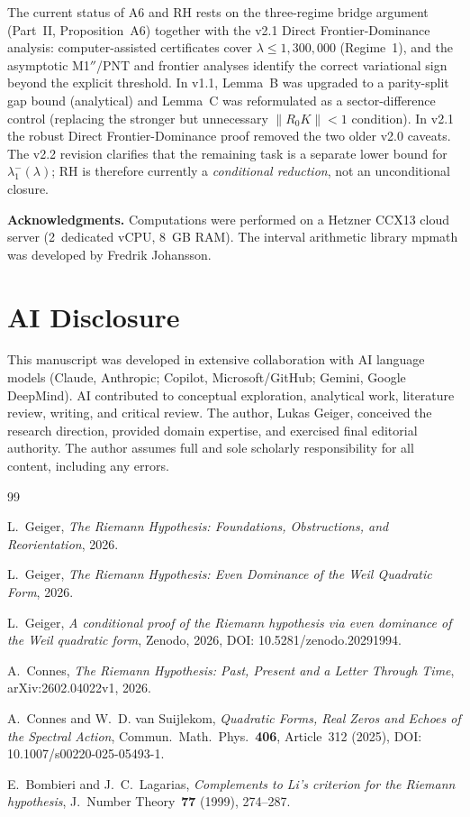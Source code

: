 \documentclass[12pt,a4paper]{article}
\theoremstyle{definition}
\theoremstyle{remark}
\begin{document}
\noindent The current status of A6 and RH rests on the three-regime bridge
argument (Part~II, Proposition~A6) together with the v2.1 Direct
Frontier-Dominance analysis: computer-assisted certificates cover
$\lambda \leq 1{,}300{,}000$ (Regime~1), and the asymptotic M1$''$/PNT and
frontier analyses identify the correct variational sign beyond the explicit
threshold. In v1.1, Lemma~B was upgraded to a parity-split gap bound
(analytical) and Lemma~C was reformulated as a sector-difference control
(replacing the stronger but unnecessary $\|R_0 K\| < 1$ condition). In v2.1
the robust Direct Frontier-Dominance proof removed the two older v2.0
caveats. The v2.2 revision clarifies that the remaining task is a separate
lower bound for $\lambda_1^-(\lambda)$; RH is therefore currently a
\emph{conditional reduction}, not an unconditional closure.

\bigskip
\noindent\textbf{Acknowledgments.} Computations were performed on a Hetzner CCX13 cloud server (2~dedicated vCPU, 8~GB RAM). The interval arithmetic library mpmath was developed by Fredrik Johansson.


\section*{AI Disclosure}

This manuscript was developed in extensive collaboration with AI language models (Claude, Anthropic; Copilot, Microsoft/GitHub; Gemini, Google DeepMind). AI contributed to conceptual exploration, analytical work, literature review, writing, and critical review. The author, Lukas Geiger, conceived the research direction, provided domain expertise, and exercised final editorial authority. The author assumes full and sole scholarly responsibility for all content, including any errors.


\begin{thebibliography}{99}

L.~Geiger, \emph{The Riemann Hypothesis: Foundations, Obstructions, and Reorientation}, 2026.

L.~Geiger, \emph{The Riemann Hypothesis: Even Dominance of the Weil Quadratic Form}, 2026.

L.~Geiger, \emph{A conditional proof of the Riemann hypothesis via even dominance of the Weil quadratic form}, Zenodo, 2026, DOI: 10.5281/zenodo.20291994. %

A.~Connes, \emph{The Riemann Hypothesis: Past, Present and a Letter Through Time}, arXiv:2602.04022v1, 2026.

A.~Connes and W.~D. van Suijlekom, \emph{Quadratic Forms, Real Zeros and Echoes of the Spectral Action}, Commun.~Math.~Phys.~\textbf{406}, Article~312 (2025), DOI: 10.1007/s00220-025-05493-1.

E.~Bombieri and J.~C.~Lagarias, \emph{Complements to Li's criterion for the Riemann hypothesis}, J.~Number Theory~\textbf{77} (1999), 274--287.

\end{thebibliography}
\end{document}
